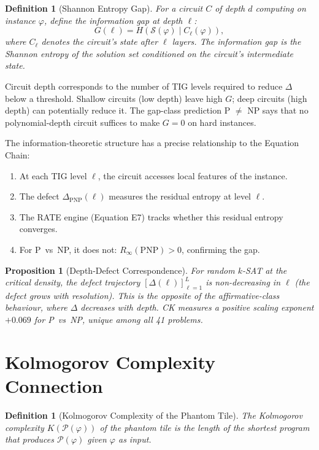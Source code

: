 \documentclass[12pt, openany]{book}
\newtheorem{proposition}[theorem]{Proposition}
\newtheorem{definition}[theorem]{Definition}
\theoremstyle{remark}
\begin{document}
\begin{definition}[Shannon Entropy Gap]
\label{def:shannon-gap}
For a circuit $C$ of depth $d$ computing on instance $\varphi$, define the
\emph{information gap} at depth $\ell$:
\[
  G(\ell) = H(\mathcal{S}(\varphi) \mid C_\ell(\varphi)),
\]
where $C_\ell$ denotes the circuit's state after $\ell$ layers.  The information
gap is the Shannon entropy of the solution set conditioned on the circuit's
intermediate state.
\end{definition}

\noindent
Circuit depth corresponds to the number of TIG levels required to reduce $\Delta$
below a threshold.  Shallow circuits (low depth) leave high $G$; deep circuits
(high depth) can potentially reduce it.  The gap-class prediction P $\neq$ NP
says that no polynomial-depth circuit suffices to make $G = 0$ on hard instances.

The information-theoretic structure has a precise relationship to the Equation
Chain:
\begin{enumerate}
  \item At each TIG level $\ell$, the circuit accesses local features of the instance.
  \item The defect $\Delta_{\mathrm{PNP}}(\ell)$ measures the residual entropy at level $\ell$.
  \item The RATE engine (Equation E7) tracks whether this residual entropy converges.
  \item For P~vs~NP, it does not: $R_\infty(\mathrm{PNP}) > 0$, confirming the gap.
\end{enumerate}

\begin{proposition}[Depth-Defect Correspondence]
\label{prop:depth-defect}
For random $k$-SAT at the critical density, the defect trajectory
$[\Delta(\ell)]_{\ell=1}^{L}$ is non-decreasing in $\ell$ (the defect
\emph{grows} with resolution).  This is the opposite of the affirmative-class
behaviour, where $\Delta$ decreases with depth.  CK measures a positive
scaling exponent $+0.069$ for P~vs~NP, unique among all 41 problems.
\end{proposition}


\section{Kolmogorov Complexity Connection}
\label{sec:kolmogorov}

\begin{definition}[Kolmogorov Complexity of the Phantom Tile]
\label{def:kolmogorov}
The Kolmogorov complexity $K(\mathcal{P}(\varphi))$ of the phantom tile is
the length of the shortest program that produces $\mathcal{P}(\varphi)$ given
$\varphi$ as input.
\end{definition}
\end{document}

